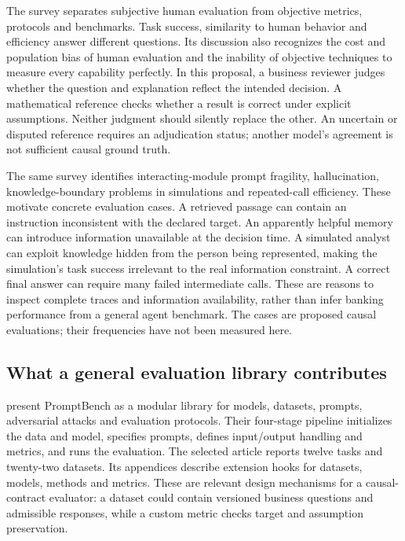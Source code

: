 The survey separates subjective human evaluation from objective metrics,
protocols and benchmarks. Task success, similarity to human behavior and
efficiency answer different questions. Its discussion also recognizes the
cost and population bias of human evaluation and the inability of objective
techniques to measure every capability perfectly. In this proposal, a
business reviewer judges whether the question and explanation reflect the
intended decision. A mathematical reference checks whether a result is
correct under explicit assumptions. Neither judgment should silently
replace the other. An uncertain or disputed reference requires an
adjudication status; another model's agreement is not sufficient causal
ground truth. \citep{exec18_framework_agents_survey}

The same survey identifies interacting-module prompt fragility,
hallucination, knowledge-boundary problems in simulations and repeated-call
efficiency. These motivate concrete evaluation cases. A retrieved passage
can contain an instruction inconsistent with the declared target. An
apparently helpful memory can introduce information unavailable at the
decision time. A simulated analyst can exploit knowledge hidden from the
person being represented, making the simulation's task success irrelevant
to the real information constraint. A correct final answer can require many
failed intermediate calls. These are reasons to inspect complete traces and
information availability, rather than infer banking performance from a
general agent benchmark. The cases are proposed causal evaluations;
their frequencies have not been measured here.
\citep{exec18_framework_agents_survey}

\subsection{What a general evaluation library contributes}

\citet{exec18_framework_promptbench} present PromptBench as a modular library
for models, datasets, prompts, adversarial attacks and evaluation protocols.
Their four-stage pipeline initializes the data and model, specifies prompts,
defines input/output handling and metrics, and runs the evaluation. The
selected article reports twelve tasks and twenty-two datasets. Its appendices
describe extension hooks for datasets, models, methods and metrics. These
are relevant design mechanisms for a causal-contract evaluator: a dataset
could contain versioned business questions and admissible responses, while
a custom metric checks target and assumption preservation.

